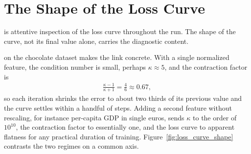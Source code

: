 




\iffalse
\newpage
\section{The Shape of the Loss Curve}


 is attentive inspection of the loss curve throughout the run.
The shape of the curve, not its final value alone, carries the diagnostic content.

 on the chocolate dataset makes the link concrete.
With a single normalized feature, the condition number is small, perhaps $\kappa \approx 5$,
and the contraction factor is
\begin{align*}
    \frac{\kappa - 1}{\kappa + 1} = \frac{4}{6} \approx 0.67,
\end{align*}
so each iteration shrinks the error to about two thirds of its previous value and the curve settles within a handful of steps.
Adding a second feature without rescaling, for instance per-capita GDP in single euros, sends $\kappa$ to the order of $10^{10}$, the contraction factor to essentially one, and the loss curve to apparent flatness for any practical duration of training.
Figure~\ref{fig:loss_curve_shape} contrasts the two regimes on a common axis.

